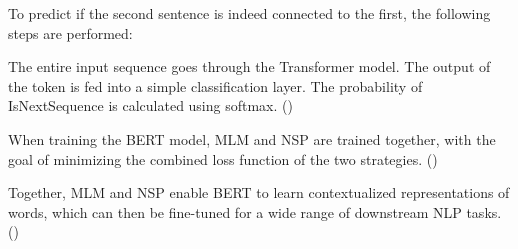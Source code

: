 To predict if the second sentence is indeed connected to the first, the following steps are performed:

The entire input sequence goes through the Transformer model. The output of the {\selectfont [CLS]} token is fed into a simple classification layer. %
The probability of {\selectfont IsNextSequence} is calculated using softmax. (\cite{devlin_bert_2019})

When training the BERT model, MLM and NSP are trained together, with the goal of minimizing the combined loss function of the two strategies. (\cite{devlin_bert_2019})

Together, MLM and NSP enable BERT to learn contextualized representations of words, which can then be fine-tuned for a wide range of downstream NLP tasks.(\cite{devlin_bert_2019})